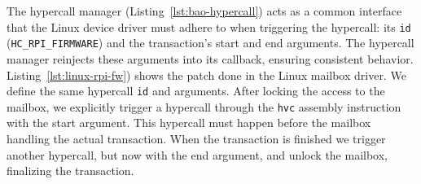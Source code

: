 \begin{longlisting}
\centering
\inputminted[]{c}{./listing/rpi_firmware.c}
\caption[SSPFS: mailbox manager added to Bao]{SSPFS: Mailbox manager added to
  Bao (see \lstinline{src/rpi_firmware.c}~\cite{thesis-sw-github})}  
\label{lst:bao-mailbox-manager}
\end{longlisting}

\begin{longlisting}
\centering
\inputminted[]{c}{./listing/hypercall.c}
\caption[SSPFS: Bao hypercall manager]{SSPFS: Bao hypercall manager (see \lstinline{src/rpi_firmware.c}~\cite{thesis-sw-github})}
\label{lst:bao-hypercall}
\end{longlisting}

The hypercall manager
(Listing~\ref{lst:bao-hypercall}) acts as a common interface that the Linux
device driver must adhere to when triggering the hypercall: its
\lstinline{id} (\lstinline{HC_RPI_FIRMWARE}) and the transaction's start and end
arguments. The hypercall manager reinjects these arguments into its callback,
ensuring consistent behavior.
%
Listing~\ref{lst:linux-rpi-fw}) shows the patch done in the Linux mailbox
driver. We define the same hypercall \lstinline{id} and arguments. After locking
the access to the mailbox, we explicitly trigger a hypercall through the
\lstinline{hvc} assembly instruction with the start argument. This hypercall
must happen before the mailbox handling the actual transaction. When the
transaction is finished we trigger another hypercall, but now with the end
argument, and unlock the mailbox, finalizing the transaction.

\begin{longlisting}
\centering
\inputminted[]{c}{./listing/linux-rpi-fw.c}
\caption[SSPFS: Linux's Raspberry Pi mailbox driver -- patch]{SSPFS: Linux's
  Raspberry Pi mailbox driver -- patch (see \lstinline{src/linux-rpi-fw.c}~\cite{thesis-sw-github})}
\label{lst:linux-rpi-fw}
\end{longlisting}


